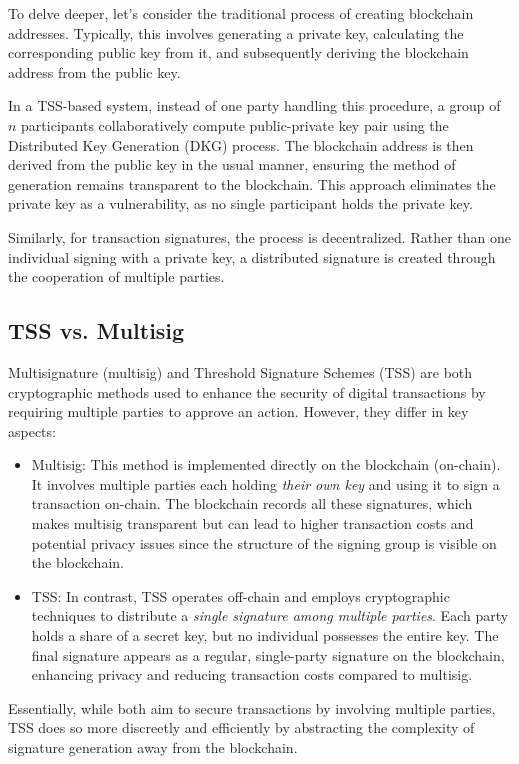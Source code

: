 \documentclass{article}
\begin{document}
To delve deeper, let's consider the traditional process of creating blockchain addresses. Typically, this involves generating a private key, calculating the corresponding public key from it, and subsequently deriving the blockchain address from the public key.

In a TSS-based system, instead of one party handling this procedure, a group of \(n\) participants collaboratively compute public-private key pair using the Distributed Key Generation (DKG) process. The blockchain address is then derived from the public key in the usual manner, ensuring the method of generation remains transparent to the blockchain. This approach eliminates the private key as a vulnerability, as no single participant holds the private key.

Similarly, for transaction signatures, the process is decentralized. Rather than one individual signing with a private key, a distributed signature is created through the cooperation of multiple parties. 

\subsection{TSS vs. Multisig}
Multisignature (multisig) and Threshold Signature Schemes (TSS) are both cryptographic methods used to enhance the security of digital transactions by requiring multiple parties to approve an action. However, they differ in key aspects:
\begin{itemize}
    \item Multisig: This method is implemented directly on the blockchain (on-chain). It involves multiple parties each holding \textit{their own key} and using it to sign a transaction on-chain. The blockchain records all these signatures, which makes multisig transparent but can lead to higher transaction costs and potential privacy issues since the structure of the signing group is visible on the blockchain.
    \item TSS: In contrast, TSS operates off-chain and employs cryptographic techniques to distribute a \textit{single signature among multiple parties}. Each party holds a share of a secret key, but no individual possesses the entire key. The final signature appears as a regular, single-party signature on the blockchain, enhancing privacy and reducing transaction costs compared to multisig.

\end{itemize}

Essentially, while both aim to secure transactions by involving multiple parties, TSS does so more discreetly and efficiently by abstracting the complexity of signature generation away from the blockchain.
\end{document}
